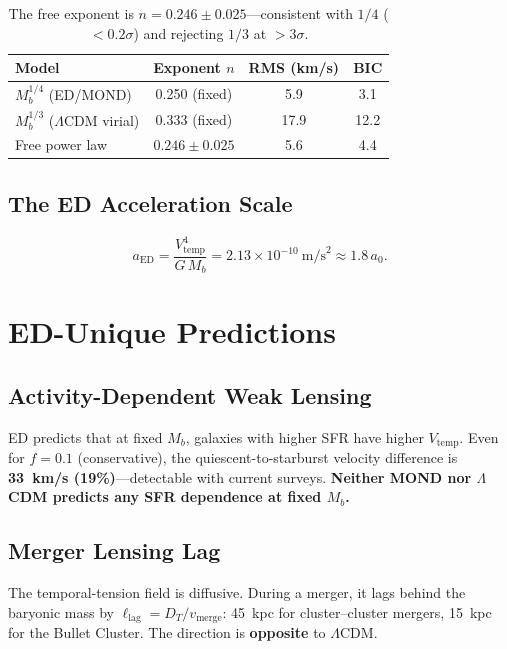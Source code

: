 \documentclass[12pt,letterpaper]{article}
\begin{document}
\begin{table}[H]
\centering
\begin{tabular}{@{}lccc@{}}
\toprule
Model & Exponent $n$ & RMS (km/s) & BIC \\
\midrule
$M_b^{1/4}$ (ED/MOND) & 0.250 (fixed) & 5.9 & 3.1 \\
$M_b^{1/3}$ ($\Lambda$CDM virial) & 0.333 (fixed) & 17.9 & 12.2 \\
Free power law & $0.246 \pm 0.025$ & 5.6 & 4.4 \\
\bottomrule
\end{tabular}
\caption{The free exponent is $n = 0.246 \pm 0.025$---consistent with $1/4$ ($< 0.2\sigma$) and rejecting $1/3$ at $> 3\sigma$.}
\end{table}

\subsection{The ED Acceleration Scale}
\begin{equation}
a_{\mathrm{ED}} = \frac{V_{\mathrm{temp}}^4}{G\,M_b} = 2.13 \times 10^{-10}~\mathrm{m/s}^2 \approx 1.8\,a_0. \label{eq:a_ed}
\end{equation}

\section{ED-Unique Predictions}

\subsection{Activity-Dependent Weak Lensing}

ED predicts that at fixed $M_b$, galaxies with higher SFR have higher $V_{\mathrm{temp}}$. Even for $f = 0.1$ (conservative), the quiescent-to-starburst velocity difference is \textbf{33~km/s (19\%)}---detectable with current surveys. \textbf{Neither MOND nor $\Lambda$CDM predicts any SFR dependence at fixed $M_b$.}

\subsection{Merger Lensing Lag}

The temporal-tension field is diffusive. During a merger, it lags behind the baryonic mass by $\ell_{\mathrm{lag}} = D_T / v_{\mathrm{merge}}$: 45~kpc for cluster--cluster mergers, 15~kpc for the Bullet Cluster. The direction is \textbf{opposite} to $\Lambda$CDM.
\end{document}
